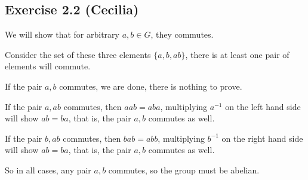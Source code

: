 \subsection*{Exercise 2.2 (Cecilia)}

We will show that for arbitrary $ a, b \in G $, they commutes.

Consider the set of these three elements $ \{a, b, ab\} $, there is at least one pair of elements will commute.

If the pair $ a, b $ commutes, we are done, there is nothing to prove.

If the pair  $ a, ab $ commutes, then $ aab = aba $, multiplying $ a^{-1} $ on the left hand side will show $ ab = ba $, that is, the pair $ a, b $ commutes as well.

If the pair  $ b, ab $ commutes, then $ bab = abb $, multiplying $ b^{-1} $ on the right hand side will show $ ab = ba $, that is, the pair $ a, b $ commutes as well.

So in all cases, any pair $ a, b $ commutes, so the group must be abelian.
